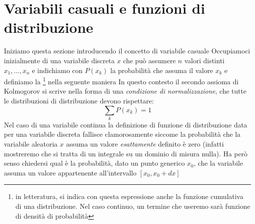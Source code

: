 \documentclass{report}
\begin{document}
\section{Variabili casuali e funzioni di distribuzione}
Iniziamo questa sezione introducendo il concetto di variabile casuale
\noindent Occupiamoci inizialmente di una variabile discreta $x$ che può assumere $n$ valori distinti $x_1, \dots, x_n$ e indichiamo con $P(x_k)$ la probabilità che assuma il valore $x_k$ e definiamo la \footnote{in letteratura, si indica con questa espressione anche la funzione cumulativa di una distribuzione. Nel caso continuo, un termine che useremo sarà funzione di densità di probabilità} nella seguente maniera
\noindent In questo contesto il secondo assioma di Kolmogorov si scrive nella forma di una \emph{condizione di normalizzazione}, che tutte le distribuzioni di distribuzione devono rispettare:
$$
	\sum_k P(x_k) = 1
$$
Nel caso di una variabile continua la definizione di funzione di distribuzione data per una variabile discreta fallisce clamorosamente siccome la probabilità che la variabile aleatoria $x$ assuma un valore \emph{esattamente} definito è zero (infatti mostreremo che si tratta di un integrale su un dominio di misura nulla). Ha però senso chiedersi qual è la probabilità, dato un punto generico $x_0$, che la variabile assuma un valore appartenente all'intervallo $[x_0, x_0 + dx]$
\end{document}
